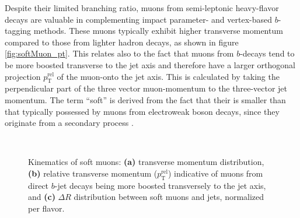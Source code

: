 Despite their limited branching ratio, muons from semi-leptonic heavy-flavor decays are valuable in complementing impact parameter- and vertex-based $b$-tagging methods. These muons typically exhibit higher transverse momentum compared to those from lighter hadron decays, as shown in figure \ref{fig:softMuon_pt}. This relates also to the fact that muons from $b$-decays tend to be more boosted transverse to the jet axis and therefore have a larger orthogonal projection $p_\text{T}^\text{rel}$ of the muon-\pt onto the jet axis. This is calculated by taking the perpendicular part of the three vector muon-momentum to the three-vector jet momentum. The term ``soft'' is derived from the fact that their \pt is smaller than that typically possessed by muons from electroweak boson decays, since they originate from a secondary process \citep{ATL-PHYS-PUB-2017-013}.
\begin{figure}[htbp]
  \centering
  \hspace*{0.5cm}
  \\
  \caption{Kinematics of soft muons: \textbf{(a)} transverse momentum distribution, \textbf{(b)} relative transverse momentum ($p_\text{T}^\text{rel}$) indicative of muons from direct $b$-jet decays being more boosted transversely to the jet axis, and \textbf{(c)} $\Delta R$ distribution between soft muons and jets, normalized per flavor.}
  \label{fig:muonsForSMT}
\end{figure}



